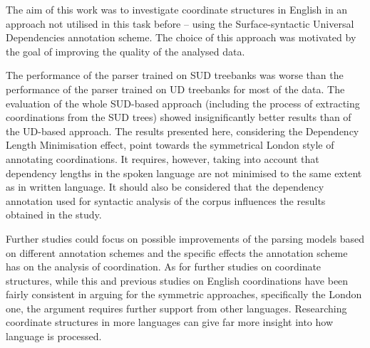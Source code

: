 The aim of this work was to investigate coordinate structures in English in an approach not utilised in this task before -- using the Surface-syntactic Universal Dependencies annotation scheme. The choice of this approach was motivated by the goal of improving the quality of the analysed data. 

The performance of the parser trained on SUD treebanks was worse than the performance of the parser trained on UD treebanks for most of the data. The evaluation of the whole SUD-based approach (including the process of extracting coordinations from the SUD trees) showed insignificantly better results than of the UD-based approach. The results presented here, considering the Dependency Length Minimisation effect, point towards the symmetrical London style of annotating coordinations. It requires, however, taking into account that dependency lengths in the spoken language are not minimised to the same extent as in written language. It should also be considered that the dependency annotation used for syntactic analysis of the corpus influences the results obtained in the study.

Further studies could focus on possible improvements of the parsing models based on different annotation schemes and the specific effects the annotation scheme has on the analysis of coordination. As for further studies on coordinate structures, while this and previous studies on English coordinations have been fairly consistent in arguing for the symmetric approaches, specifically the London one, the argument requires further support from other languages. Researching coordinate structures in more languages can give far more insight into how language is processed. 